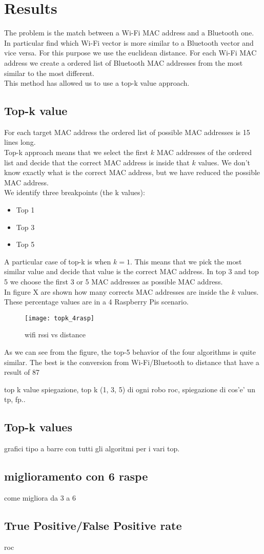 \section{Results}
The problem is the match between a Wi-Fi MAC address and a Bluetooth one. In particular find which Wi-Fi vector is more similar to a Bluetooth vector and vice versa. For this purpose we use the euclidean distance. For each Wi-Fi MAC address we create a ordered list of Bluetooth MAC addresses from the most similar to the most different.\\
This method has allowed us to use a top-k value approach.

\subsection{Top-k value}
For each target MAC address the ordered list of possible MAC addresses is 15 lines long. \\
Top-k approach means that we select the first \(k\) MAC addresses of the ordered list and decide that the correct MAC address is inside that \(k\) values. We don't know exactly what is the correct MAC address, but we have reduced the possible MAC address.\\
\linebreak 
We identify three breakpoints (the k values):
\begin{itemize}
\item Top 1
\item Top 3
\item Top 5
\end{itemize}
A particular case of top-k is when \(k = 1\). This means that we pick the most similar value and decide that value is the correct MAC address.
In top 3 and top 5 we choose the first 3 or 5 MAC addresses as possible MAC address.\\
\linebreak
In figure X are shown how many corrects MAC addresses are inside the \(k\) values. These percentage values are in a 4 Raspberry Pis scenario.
\begin{figure}[H]
\centering
\texttt{[image: topk\_4rasp]}
\caption{wifi rssi vs distance}
\end{figure}
As we can see from the figure, the top-5 behavior of the four algorithms is quite similar. The best is the conversion from Wi-Fi/Bluetooth to distance that have a result of 87%

top k value spiegazione, top k (1, 3, 5) di ogni robo
roc, spiegazione di cos'e' un tp, fp..

\subsection{Top-k values}
grafici tipo a barre con tutti gli algoritmi per i vari top.


\subsection{miglioramento con 6 raspe}
come migliora da 3 a 6


\subsection{True Positive/False Positive rate}
roc

